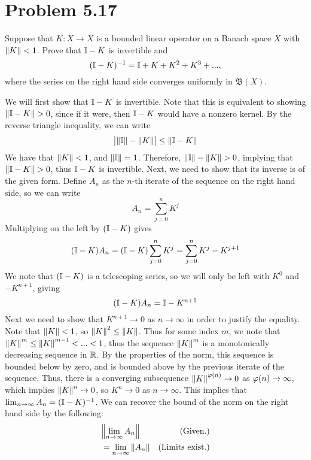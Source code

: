 \section{Problem 5.17}
Suppose that $K : X \rightarrow X$ is a bounded linear operator on a Banach space $X$ with $\norm{K} < 1$. Prove that $\mathbb{I} - K$ is invertible and 
\[(\mathbb{I} - K)^{-1}  = \mathbb{I} + K + K^2 + K^3 + ...,\]
where the series on the right hand side converges uniformly in $\mathfrak{B}(X)$.
\partbreak
\begin{solution}

    We will first show that $\mathbb{I} - K$ is invertible. Note that this is equivalent to showing $\norm{\mathbb{I} - K} > 0$, since if it were, then $\mathbb{I}  - K$ would have a nonzero kernel. By the reverse triangle inequality, we can write
    \[\big| \norm{\mathbb{I}} - \norm{K} \big| \leq \norm{\mathbb{I} - K}\]
    We have that $\norm{K} < 1$, and $\norm{\mathbb{I}} = 1$. Therefore, $\norm{ \mathbb{I}} - \norm{K} > 0$, implying that $\norm{\mathbb{I} - K} > 0$, thus $\mathbb{I} - K$ is invertible. Next, we need to show that its inverse is of the given form. Define $A_n$ as the $n$-th iterate of the sequence on the right hand side, so we can write
    \[A_n = \sum_{j = 0}^n K^j\]
    Multiplying on the left by $(\mathbb{I} - K)$ gives
    \[(\mathbb{I} - K) A_n = (\mathbb{I} - K)\sum_{j = 0}^n K^j = \sum_{j = 0}^n K^j - K^{j+1}\]
    We note that $(\mathbb{I} - K)$ is a telescoping series, so we will only be left with $K^0$ and $-K^{n+1}$, giving
    \[(\mathbb{I} - K) A_n = \mathbb{I} - K^{n+1}\]
    Next we need to show that $K^{n+1} \rightarrow 0$ as $n \rightarrow \infty$ in order to justify the equality. Note that $\norm{K} < 1$, so $\norm{K}^2 \leq \norm{K}$. Thus for some index $m$, we note that $\norm{K}^m \leq \norm{K}^{m-1} < ... < 1$, thus the sequence $\norm{K}^m$ is a monotonically decreasing sequence in $\mathbb{R}$. By the properties of the norm, this sequence is bounded below by zero, and is bounded above by the previous iterate of the sequence. Thus, there is a converging subsequence $\norm{K}^{\varphi(n)} \rightarrow 0$ as $\varphi(n) \rightarrow \infty$, which implies $\norm{K}^n \rightarrow 0$, so $K^n \rightarrow 0$ as $n\rightarrow \infty$. This implies that $\lim_{n \rightarrow \infty}A_n = (\mathbb{I} - K)^{-1}$. We can recover the bound of the norm on the right hand side by the following:
    \newpage
    \tightalignbreak
    \begin{align*}
        &\norm{\lim_{n \rightarrow \infty} A_n} &\text{(Given.)}\\
        &= \lim_{n \rightarrow \infty}\norm{A_n} &\text{(Limits exist.)}\\

\end{align*}
\end{solution}
